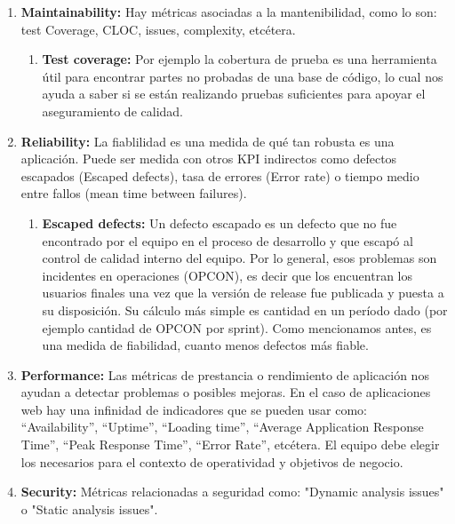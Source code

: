   \begin{enumerate}    

  \item {\textbf{Maintainability:} Hay métricas asociadas a la mantenibilidad, como lo son: test Coverage, CLOC, issues, complexity,  etcétera. 
  
    \begin{enumerate}    
    \item {\textbf{Test coverage:}
Por ejemplo la cobertura de prueba es una herramienta útil para encontrar partes no probadas de una base de código, lo cual nos ayuda a saber si se están realizando pruebas suficientes para apoyar el aseguramiento de calidad.
}
  \end{enumerate}
}

  \item {\textbf{Reliability:} La fiablilidad es una medida de qué tan robusta es una aplicación. Puede ser medida con otros KPI indirectos como defectos escapados (Escaped defects), tasa de errores (Error rate) o tiempo medio entre fallos (mean time between failures).
  
  \begin{enumerate}    
    \item {\textbf{Escaped defects:}
Un defecto escapado es un defecto que no fue encontrado por el equipo en el proceso de desarrollo y que escapó al control de calidad interno del equipo. Por lo general, esos problemas son incidentes en operaciones (OPCON), es decir que los encuentran los usuarios finales una vez que la versión de release fue publicada y puesta a su disposición. Su cálculo más simple es cantidad en un período dado (por ejemplo cantidad de OPCON por sprint). Como mencionamos antes, es una medida de fiabilidad, cuanto menos defectos más fiable.
}
  \end{enumerate}
  }


  \item {\textbf{Performance:}
Las métricas de prestancia o rendimiento de aplicación nos ayudan a detectar problemas o posibles mejoras. En el caso de aplicaciones web hay una infinidad de indicadores que se pueden usar como: “Availability”, “Uptime”, “Loading time”, “Average Application Response Time”, “Peak Response Time”, “Error Rate”, etcétera. El equipo debe elegir los necesarios para el contexto de operatividad y objetivos de negocio.
}

  \item {\textbf{Security:}
  Métricas relacionadas a seguridad como: "Dynamic analysis issues" o "Static analysis issues".
}

  \end{enumerate}

